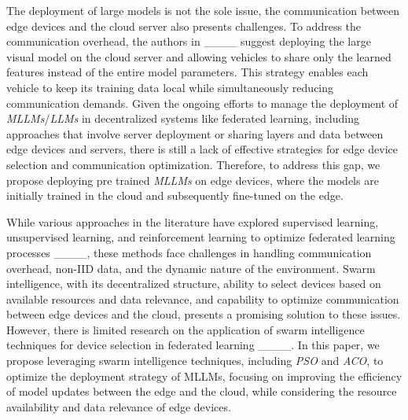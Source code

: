 The deployment of large models is not the sole issue, the communication between edge devices and the cloud server also presents challenges. To address the communication overhead, the authors in ____ suggest deploying the large visual model on the cloud server and allowing vehicles to share only the learned features instead of the entire model parameters. This strategy enables each vehicle to keep its training data local while simultaneously reducing communication demands.
Given the ongoing efforts to manage the deployment of \textit{MLLMs}/\textit{LLMs} in decentralized systems like federated learning, including approaches that involve server deployment or sharing layers and data between edge devices and servers, there is still a lack of effective strategies for edge device selection and communication optimization. Therefore, to address this gap, we propose deploying pre trained \textit{MLLMs} on edge devices, where the models are initially trained in the cloud and subsequently fine-tuned on the edge. 

While various approaches in the literature have explored supervised learning, unsupervised learning, and reinforcement learning to optimize federated learning processes ____, these methods face challenges in handling communication overhead, non-IID data, and the dynamic nature of the environment. Swarm intelligence, with its decentralized structure, ability to select devices based on available resources and data relevance, and capability to optimize communication between edge devices and the cloud, presents a promising solution to these issues. However, there is limited research on the application of swarm intelligence techniques for device selection in federated learning ____. In this paper, we propose leveraging swarm intelligence techniques, including \textit{PSO} and \textit{ACO}, to optimize the deployment strategy of MLLMs, focusing on improving the efficiency of model updates between the edge and the cloud, while considering the resource availability and data relevance of edge devices.

